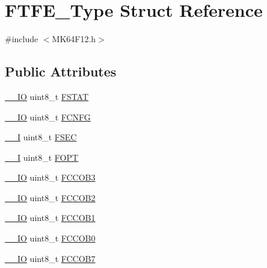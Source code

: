 \hypertarget{structFTFE__Type}{}\section{F\+T\+F\+E\+\_\+\+Type Struct Reference}
\label{structFTFE__Type}


{\ttfamily \#include $<$M\+K64\+F12.\+h$>$}

\subsection*{Public Attributes}
\begin{DoxyCompactItemize}
\item 
\hyperlink{core__sc300_8h_aec43007d9998a0a0e01faede4133d6be}{\+\_\+\+\_\+\+IO} uint8\+\_\+t \hyperlink{structFTFE__Type_a2bb1265d087542796f71842efcb496ce}{F\+S\+T\+AT}
\item 
\hyperlink{core__sc300_8h_aec43007d9998a0a0e01faede4133d6be}{\+\_\+\+\_\+\+IO} uint8\+\_\+t \hyperlink{structFTFE__Type_a82c4d1d40ee6da2a49470433428137da}{F\+C\+N\+FG}
\item 
\hyperlink{core__sc300_8h_af63697ed9952cc71e1225efe205f6cd3}{\+\_\+\+\_\+I} uint8\+\_\+t \hyperlink{structFTFE__Type_a847ed6979efb70e72ff11cac48e8f675}{F\+S\+EC}
\item 
\hyperlink{core__sc300_8h_af63697ed9952cc71e1225efe205f6cd3}{\+\_\+\+\_\+I} uint8\+\_\+t \hyperlink{structFTFE__Type_ac099943969dd6ce0d003e6f5fc7239da}{F\+O\+PT}
\item 
\hyperlink{core__sc300_8h_aec43007d9998a0a0e01faede4133d6be}{\+\_\+\+\_\+\+IO} uint8\+\_\+t \hyperlink{structFTFE__Type_a026658117f846dcdd32c059ebcdedd0d}{F\+C\+C\+O\+B3}
\item 
\hyperlink{core__sc300_8h_aec43007d9998a0a0e01faede4133d6be}{\+\_\+\+\_\+\+IO} uint8\+\_\+t \hyperlink{structFTFE__Type_ae595ecb7bc42f54f9d912e02929bc12e}{F\+C\+C\+O\+B2}
\item 
\hyperlink{core__sc300_8h_aec43007d9998a0a0e01faede4133d6be}{\+\_\+\+\_\+\+IO} uint8\+\_\+t \hyperlink{structFTFE__Type_ae8fc27166f31457cda3358ed9c89a04b}{F\+C\+C\+O\+B1}
\item 
\hyperlink{core__sc300_8h_aec43007d9998a0a0e01faede4133d6be}{\+\_\+\+\_\+\+IO} uint8\+\_\+t \hyperlink{structFTFE__Type_a0a8aa6eadd81f1905d667fe5913250a9}{F\+C\+C\+O\+B0}
\item 
\hyperlink{core__sc300_8h_aec43007d9998a0a0e01faede4133d6be}{\+\_\+\+\_\+\+IO} uint8\+\_\+t \hyperlink{structFTFE__Type_a9b10b2371aad9262d5bdb672cd56e59b}{F\+C\+C\+O\+B7}

\end{DoxyCompactItemize}
